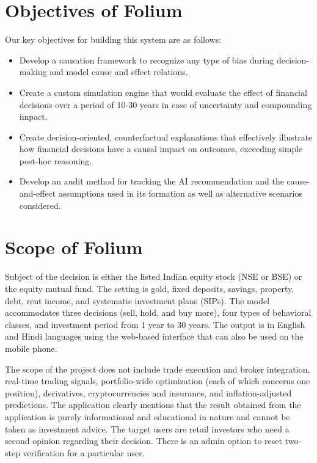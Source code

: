 \section{Objectives of Folium}
Our key objectives for building this system are as follows:

\begin{itemize}
\item Develop a causation framework to recognize any type of bias during decision-making and model cause and effect relations.
\item Create a custom simulation engine that would evaluate the effect of financial decisions over a period of 10-30 years in case of uncertainty and compounding impact.
\item Create decision-oriented, counterfactual explanations that effectively illustrate how financial decisions have a causal impact on outcomes, exceeding simple post-hoc reasoning.
\item Develop an audit method for tracking the AI recommendation and the cause-and-effect assumptions used in its formation as well as alternative scenarios considered.
\end{itemize}

\section{Scope of Folium}
Subject of the decision is either the listed Indian equity stock (NSE or BSE) or the equity mutual fund. The setting is gold, fixed deposits, savings, property, debt, rent income, and systematic investment plans (SIPs). The model accommodates three decisions (sell, hold, and buy more), four types of behavioral classes, and investment period from 1 year to 30 years. The output is in English and Hindi languages using the web-based interface that can also be used on the mobile phone.

The scope of the project does not include trade execution and broker integration, real-time trading signals, portfolio-wide optimization (each of which concerns one position), derivatives, cryptocurrencies and insurance, and inflation-adjusted predictions. The application clearly mentions that the result obtained from the application is purely informational and educational in nature and cannot be taken as investment advice. The target users are retail investors who need a second opinion regarding their decision. There is an admin option to reset two-step verification for a particular user.

